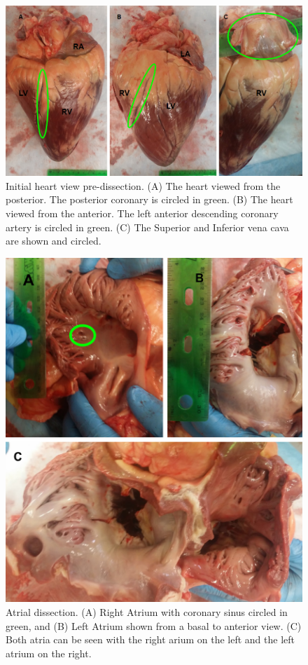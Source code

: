 \documentclass[12pt]{article}
\begin{document}
\begin{figure}[H]

	\centering	
	\includegraphics[width = 1\textwidth]{Figures/Heart1.png}
	\caption{ Initial heart view pre-dissection. (A) The heart viewed from the posterior. The posterior coronary is circled in green. (B) The heart viewed from the anterior. The left anterior descending coronary artery is circled in green. (C) The Superior and Inferior vena cava are shown and circled.}
	\label{fig:H1}
\end{figure}
\begin{figure}[H]
	
	\centering	
	\includegraphics[width = 1\textwidth]{Figures/Heart2.png}
	\caption{Atrial dissection. (A) Right Atrium with coronary sinus circled in green, and (B) Left Atrium shown from a basal to anterior view. (C) Both atria can be seen with the right arium on the left and the left atrium on the right.}
	\label{fig:H2}
\end{figure}
\end{document}
